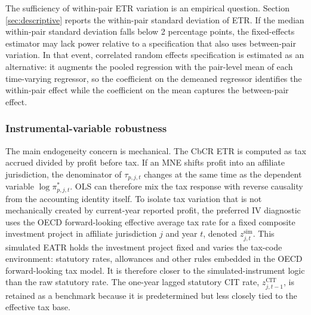 \documentclass[11pt,a4paper]{article}
\begin{document}
The sufficiency of within-pair ETR variation is an empirical question. Section \ref{sec:descriptive} reports the within-pair standard deviation of ETR. If the median within-pair standard deviation falls below 2 percentage points, the fixed-effects estimator may lack power relative to a specification that also uses between-pair variation. In that event, correlated random effects specification is estimated as an alternative: it augments the pooled regression with the pair-level mean of each time-varying regressor, so the coefficient on the demeaned regressor identifies the within-pair effect while the coefficient on the mean captures the between-pair effect.

\subsubsection{Instrumental-variable robustness}\label{sec:iv_strategy}

The main endogeneity concern is mechanical. The CbCR ETR is computed as tax accrued divided by profit before tax. If an MNE shifts profit into an affiliate jurisdiction, the denominator of $\tau_{p,j,t}$ changes at the same time as the dependent variable $\log \pi^{*}_{p,j,t}$. OLS can therefore mix the tax response with reverse causality from the accounting identity itself. To isolate tax variation that is not mechanically created by current-year reported profit, the preferred IV diagnostic uses the OECD forward-looking effective average tax rate for a fixed composite investment project in affiliate jurisdiction $j$ and year $t$, denoted $z_{j,t}^{\text{sim}}$. This simulated EATR holds the investment project fixed and varies the tax-code environment: statutory rates, allowances and other rules embedded in the OECD forward-looking tax model. It is therefore closer to the simulated-instrument logic than the raw statutory rate. The one-year lagged statutory CIT rate, $z_{j,t-1}^{\text{CIT}}$, is retained as a benchmark because it is predetermined but less closely tied to the effective tax base.
\end{document}
